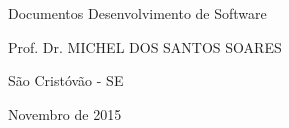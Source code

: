 \bigskip


\bigskip


\bigskip


\bigskip

{\centering{}
\textcolor[rgb]{0.078431375,0.09411765,0.13725491}{Documentos Desenvolvimento de Software}
\par}


\bigskip


\bigskip


\bigskip


\bigskip


\bigskip

{\centering{}
\textcolor[rgb]{0.078431375,0.09411765,0.13725491}{Prof. Dr. MICHEL DOS SANTOS SOARES}
\par}


\bigskip


\bigskip


\bigskip


\bigskip


\bigskip


\bigskip


\bigskip


\bigskip


\bigskip


\bigskip

{\centering{}
\textcolor[rgb]{0.078431375,0.09411765,0.13725491}{São Cristóvão - SE}
\par}


\bigskip

{\centering{}
\textcolor[rgb]{0.078431375,0.09411765,0.13725491}{Novembro de 2015}
\par}
